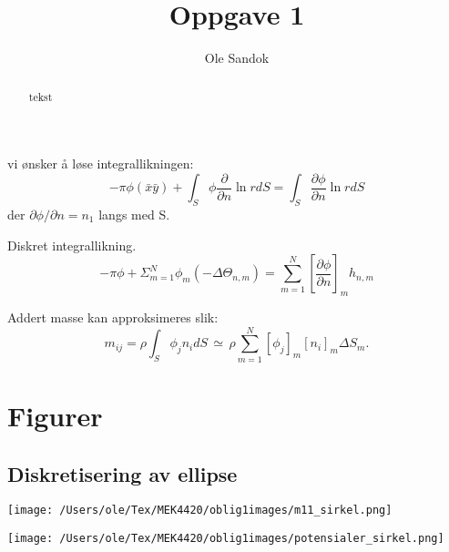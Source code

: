 \documentclass{article}
\title{Oppgave 1}
\author{Ole Sandok}
\begin{document}
\maketitle

\begin{abstract}
tekst
\end{abstract}

\tableofcontents

\section{ }


\section{}
vi ønsker å løse integrallikningen:
\begin{equation}
    -\pi \phi(\bar{x}\bar{y})  + \int_{S} \phi  \frac{\partial }{\partial n} \ln r dS = \int_{S}  \frac{\partial \phi}{\partial n} \ln r dS
\end{equation}
der $\partial \phi / \partial n = n_1$ langs med S.

Diskret integrallikning.
\begin{equation}
    -\pi \phi  + \Sigma_{m=1}^N \phi_m (-\Delta \Theta_{n,m})   =  \sum_{m=1}^N [\frac{\partial \phi}{\partial n}]_m h_{n,m}
\end{equation}

Addert masse kan approksimeres slik:
\begin{equation}
    m_{ij}  = \rho \int_{S} \phi_j n_i dS \, \simeq \, \rho \sum_{m=1}^N [\phi_j]_m  [n_i]_m \Delta S_m.
\end{equation}





\section{Figurer}
\subsection{Diskretisering av ellipse}





{\noindent\texttt{[image: /Users/ole/Tex/MEK4420/oblig1images/m11\_sirkel.png]}
}

{\noindent\texttt{[image: /Users/ole/Tex/MEK4420/oblig1images/potensialer\_sirkel.png]}
}
\end{document}
